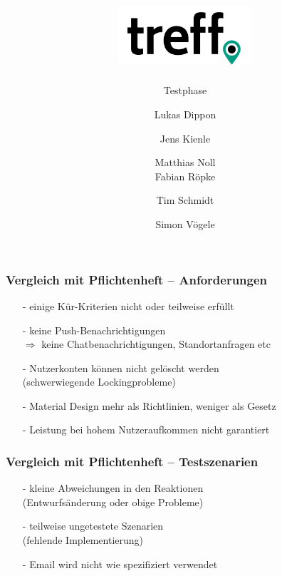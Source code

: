 \documentclass[aspectratio=1610]{beamer}
\title{\includegraphics[width = 50mm]{images/logo_crop.png}}
\subtitle{\huge Testphase}
\author{Lukas Dippon
	\and Jens Kienle
	\and Matthias Noll
    \\Fabian Röpke
	\and Tim Schmidt
	\and Simon Vögele}
\begin{document}
	\begin{frame}[plain]
	\maketitle
	\end{frame}


	\begin{frame}[plain]
        \frametitle{\textbf{Vergleich mit Pflichtenheft} -- Anforderungen}

        \begin{itemize}
          \item[-] einige Kür-Kriterien nicht oder teilweise erfüllt
          \item[-] keine Push-Benachrichtigungen \\
                   $\Rightarrow$ keine Chatbenachrichtigungen,
                   Standortanfragen etc
          \item[-] Nutzerkonten können nicht gelöscht werden \\
                   (schwerwiegende Lockingprobleme)
          \item[-] Material Design mehr als Richtlinien, weniger als Gesetz
          \item[-] Leistung bei hohem Nutzeraufkommen nicht garantiert
        \end{itemize}

  \end{frame}

  \begin{frame}[plain]
        \frametitle{\textbf{Vergleich mit Pflichtenheft} -- Testszenarien}

        \begin{itemize}
          \item[-] kleine Abweichungen in den Reaktionen \\
                   (Entwurfsänderung oder obige Probleme)
          \item[-] teilweise ungetestete Szenarien \\
                   (fehlende Implementierung)
          \item[-] Email wird nicht wie spezifiziert verwendet
        \end{itemize}

  \end{frame}

\end{document}
